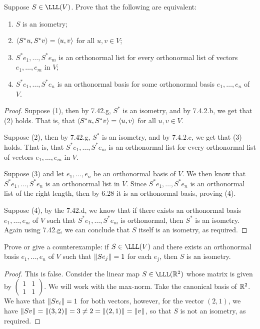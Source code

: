 \begin{exercise}{10}
  Suppose $S\in\LLL(V)$. Prove that the following are equivalent:
  \begin{enumerate}
      \item $S$ is an isometry;
      \item $\langle S^\ast u,S^\ast v\rangle=\langle u,v\rangle$ for all $u,v\in V$;
      \item $S^\ast e_1,\dots, S^\ast e_m$ is an orthonormal list for every orthonormal list of vectors $e_1,\dots,e_m$ in $V$;
      \item $S^\ast e_1,\dots,S^\ast e_n$ is an orthonormal basis for some orthonormal basis $e_1,\dots,e_n$ of $V$.
  \end{enumerate}
\end{exercise}
\begin{proof}
 Suppose (1), then by 7.42.g, $S^\ast$ is an isometry, and by 7.4.2.b, we get that (2) holds. That is, that $\langle S^\ast u,S^\ast v\rangle =\langle u,v\rangle$ for all $u,v\in V$.

 Suppose (2), then by 7.42.g, $S^\ast$ is an isometry, and by 7.4.2.c, we get that (3) holds. That is, that $S^\ast e_1,\dots,S^\ast e_m$ is an orthonormal list for every orthonormal list of vectors $e_1,\dots,e_m$ in $V$.

 Suppose (3) and let $e_1,\dots,e_n$ be an orthonormal basis of $V$. We then know that $S^\ast e_1,\dots,S^\ast e_n$ is an orthonormal list in $V$. Since $S^\ast e_1,\dots,S^\ast e_n$ is an orthonormal list of the right length, then by 6.28 it is an orthonormal basis, proving (4).

 Suppose (4), by the 7.42.d, we know that if there exists an orthonormal basis $e_1,\dots,e_m$ of $V$ such that $S^\ast e_1,\dots,S^\ast e_m$ is orthonormal, then $S^\ast$ is an isometry. Again using 7.42.g, we can conclude that $S$ itself is an isometry, as required.
\end{proof}

\begin{exercise}{13}
  Prove or give a counterexample: if $S\in\LLL(V)$ and there exists an orthonormal basis $e_1,\dots,e_n$ of $V$ such that $\left\lVert Se_j\right\rVert=1$ for each $e_j$, then $S$ is an isometry.
\end{exercise}
\begin{proof}
 This is false. Consider the linear map $S\in\LLL(\R^2)$ whose matrix is given by
 $\begin{pmatrix}
     1 & 1\\
     1 & 1
 \end{pmatrix}$. We will work with the max-norm. Take the canonical basis of $\mathbb{R}^2$. We have that $\left\lVert Se_i\right\rVert=1$ for both vectors, however, for the vector $(2,1)$, we have $\left\lVert Sv\right\rVert =\left\lVert (3,2)\right\rVert =3 \neq 2 =\left\lVert (2,1)\right\rVert =\left\lVert v\right\rVert$, so that $S$ is not an isometry, as required.
\end{proof}